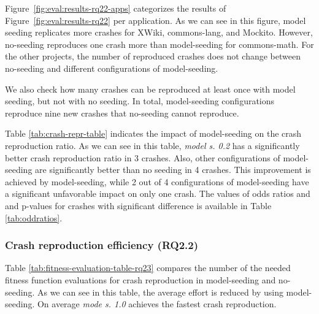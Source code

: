 Figure~\ref{fig:eval:results-rq22-apps} categorizes the results of Figure~\ref{fig:eval:results-rq22} per application. As we can see in this figure, model seeding replicates more crashes for XWiki, commons-lang, and Mockito. However, no-seeding reproduces one crash more than model-seeding for commons-math. For the other projects, the number of reproduced crashes does not change between no-seeding and different configurations of model-seeding. 

We also check how many crashes can be reproduced at least once with model seeding, but not with no seeding. In total, model-seeding configurations reproduce nine new crashes that no-seeding cannot reproduce.

Table \ref{tab:crash-repr-table} indicates the impact of model-seeding on the crash reproduction ratio. As we can see in this table, \textit{model s. 0.2} has a significantly better crash reproduction ratio in 3 crashes. Also, other configurations of model-seeding are significantly better than no seeding in 4 crashes. This improvement is achieved by model-seeding, while 2 out of 4 configurations of model-seeding have a significant unfavorable impact on only one crash. The values of odds ratios and and p-values for crashes with significant difference is available in Table \ref{tab:oddratios}.




\subsubsection{Crash reproduction efficiency (\textbf{RQ2.2})}

Table \ref{tab:fitness-evaluation-table-rq23} compares the  number of the needed fitness function evaluations for crash reproduction in model-seeding and no-seeding. As we can see in this table, the average effort is reduced by using model-seeding. On average \textit{mode s. 1.0} achieves the fastest crash reproduction.


